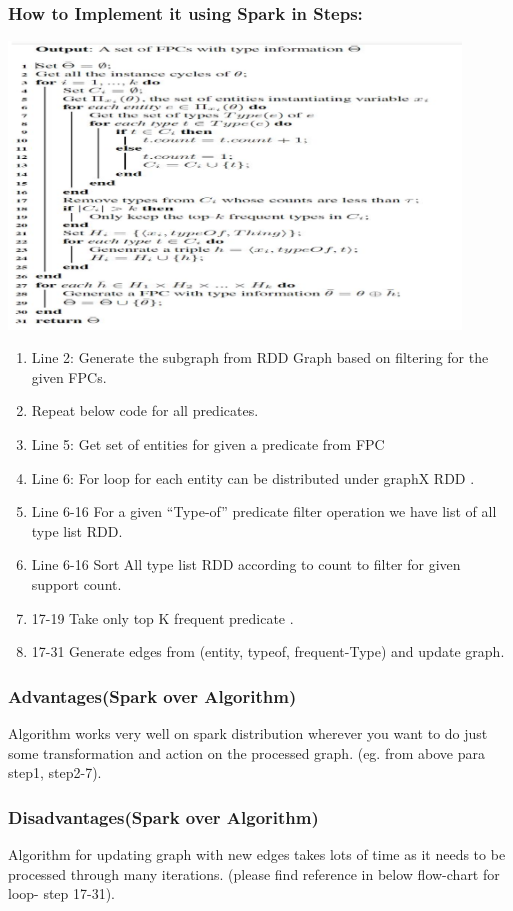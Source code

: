 \documentclass{easychair}
\begin{document}
\subsubsection{How to Implement it using Spark in Steps: }
\includegraphics[width=0.9\textwidth]{akhilesh_algo.png}
\begin{enumerate}
\item Line 2: Generate the subgraph  from RDD Graph based on filtering for the given FPCs.
\item Repeat below code for all predicates.
\item Line 5: Get set of entities for given a predicate from FPC
\item Line 6: For loop for each entity can be distributed under graphX RDD .
\item Line 6-16 For a given “Type-of” predicate filter operation we have list of all type list RDD.
\item Line 6-16 Sort All type list RDD according to count to filter for given support count.
\item 17-19 Take only top K frequent predicate .
\item 17-31 Generate edges from  (entity, typeof, frequent-Type) and update graph.

\end{enumerate}

\subsubsection{Advantages(Spark over Algorithm)}
Algorithm works very well on spark distribution wherever you want to do just some transformation and action on the processed graph. (eg. from above para step1, step2-7).

\subsubsection{Disadvantages(Spark over Algorithm)}
Algorithm for updating graph with new edges takes lots of time as it needs to be processed through many iterations. (please find reference in below flow-chart for loop- step 17-31).
\end{document}
